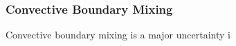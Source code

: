 {\color{purple}
\subsubsection{Convective Boundary Mixing}
}

Convective boundary mixing is a major uncertainty i

